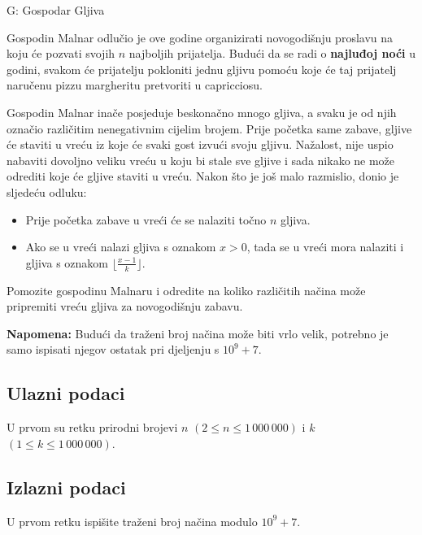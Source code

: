 \begin{statement}[
  timelimit=1 s,
  memorylimit=512 MiB,
]{G: Gospodar Gljiva}

Gospodin Malnar odlučio je ove godine organizirati novogodišnju proslavu na
koju će pozvati svojih $n$ najboljih prijatelja. Budući da se radi o
\textbf{najluđoj noći} u godini, svakom će prijatelju pokloniti jednu gljivu
pomoću koje će taj prijatelj naručenu pizzu margheritu pretvoriti u capricciosu.

Gospodin Malnar inače posjeduje beskonačno mnogo gljiva, a svaku je od njih
označio različitim nenegativnim cijelim brojem. Prije početka same zabave,
gljive će staviti u vreću iz koje će svaki gost izvući svoju gljivu.
Nažalost, nije uspio nabaviti dovoljno veliku vreću u koju bi stale sve
gljive i sada nikako ne može odrediti koje će gljive staviti u vreću. Nakon
što je još malo razmislio, donio je sljedeću odluku:

\begin{itemize}
    \item Prije početka zabave u vreći će se nalaziti točno $n$ gljiva.
    \item Ako se u vreći nalazi gljiva s oznakom $x > 0$, tada se u vreći mora
      nalaziti i gljiva s oznakom $\lfloor \frac{x-1}{k} \rfloor$.
\end{itemize}

Pomozite gospodinu Malnaru i odredite na koliko različitih načina može
pripremiti vreću gljiva za novogodišnju zabavu.

\textbf{Napomena:} Budući da traženi broj načina može biti vrlo velik, potrebno
je samo ispisati njegov ostatak pri djeljenju s $10^9+7$.

\subsection*{Ulazni podaci}
U prvom su retku prirodni brojevi $n$ $(2 \le n \le 1\,000\,000)$ i $k$
$(1 \le k \le 1\,000\,000)$.

\subsection*{Izlazni podaci}
U prvom retku ispišite traženi broj načina modulo $10^9 + 7$.


\end{statement}
